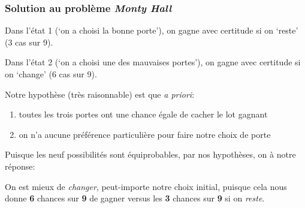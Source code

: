 \documentclass{beamer}
\begin{document}
\begin{frame}
    \begin{figure}
      \centering
      \scalebox{0.60}{}
    \end{figure}
\end{frame}


\begin{frame}
    \begin{figure}
      \centering
      \scalebox{0.60}{}
    \end{figure}
\end{frame}


\begin{frame}
    \frametitle{Solution au problème \emph{Monty Hall}}
    Dans l’état 1 (‘on a choisi la bonne porte’),
    on gagne avec certitude si on ‘reste’ (3 cas sur 9).\\

    \vfill \pause

    Dans l’état 2 (‘on a choisi une des mauvaises portes’),
    on gagne avec certitude si on ‘change’ (6 cas sur 9).\\

    \vfill \pause

    Notre hypothèse (très raisonnable) est que \emph{a priori}:
    \begin{enumerate}
      \item toutes les trois portes ont une chance égale de cacher le lot gagnant
      \item on n’a aucune préférence particulière pour faire notre choix de porte
    \end{enumerate}

    \vfill \pause

    Puisque les neuf possibilités sont équiprobables, par nos hypothèses, on à notre réponse:\\

    \vfill \pause

    On est mieux de \emph{changer}, peut-importe notre choix initial,
    puisque cela nous donne \textbf{6} chances sur \textbf{9} de gagner
    versus les \textbf{3} chances sur \textbf{9} si on \emph{reste}.
\end{frame}
\end{document}
